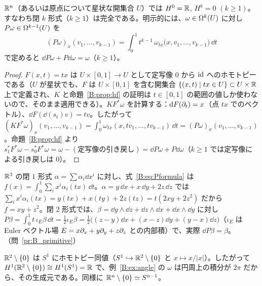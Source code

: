 \begin{cor}\label{B:cor:poincare}\tP
$\mathbb R^n$（あるいは原点について星状な開集合 $U$）では $H^0=\mathbb R$, $H^k=0$ $(k\ge1)$。すなわち閉 $k$ 形式（$k\ge1$）は完全である。明示的には、$\omega\in\Omega^k(U)$ に対し $P\omega\in\Omega^{k-1}(U)$ を
\begin{equation}\label{B:eq:Pformula}
(P\omega)_x(v_1,\dots,v_{k-1})=\int_0^1t^{k-1}\,\omega_{tx}\bigl(x,v_1,\dots,v_{k-1}\bigr)\,\dd t
\end{equation}
で定めると $\dd P\omega+P\dd\omega=\omega$（$k\ge1$）。
\end{cor}
\begin{proof}
$F(x,t)=tx$ は $U\times[0,1]\to U$ として定写像 $0$ から $\mathrm{id}$ へのホモトピーである（$U$ が星状でも、$F$ は $U\times[0,1]$ を含む開集合 $\{(x,t)\mid tx\in U\}\subset U\times\mathbb R$ 上で定義され、$K$ と命題~\ref{B:prop:hf} の証明は $t\in[0,1]$ の範囲の値しか使わないので、そのまま適用できる）。$KF^*\omega$ を計算する：$\mathrm{d} F(\partial_t)=x$（点 $tx$ でのベクトル）、$\dd F(\dd(s_t)v)=tv$。したがって $(KF^*\omega)_x(v_1,\dots,v_{k-1})=\int_0^1\omega_{tx}(x,tv_1,\dots,tv_{k-1})\,\dd t=(P\omega)_x(v_1,\dots,v_{k-1})$。命題~\ref{B:prop:hf} より $s_1^*F^*\omega-s_0^*F^*\omega=\omega-(\text{定写像の引き戻し})=\dd P\omega+P\dd\omega$（$k\ge1$ では定写像による引き戻しは $0$）。
\end{proof}

\begin{ex}[原始関数と原始形式]\label{B:ex:primitive}
$\mathbb R^3$ の閉 $1$ 形式 $\alpha=\sum\alpha_i\dd x^i$ に対し、式~\eqref{B:eq:Pformula} は $f(x)=\int_0^1\sum_ix^i\alpha_i(tx)\,\dd t$。$\alpha=y\,\dd x+x\,\dd y+2z\,\dd z$ では $\sum_ix^i\alpha_i(tx)=y(tx)+x(ty)+2z(tz)=t(2xy+2z^2)$ だから $f=xy+z^2$。閉 $2$ 形式では、$\beta=\dd y\wedge\dd z+\dd z\wedge\dd x+\dd x\wedge\dd y$ に対し $P\beta=\int_0^1t\,\iota_E\beta\,\dd t=\frac12\iota_E\beta=\frac12\bigl((z-y)\dd x+(x-z)\dd y+(y-x)\dd z\bigr)$（$\iota_E$ は Euler ベクトル場 $E=x\partial_x+y\partial_y+z\partial_z$ との内部積）で、実際 $\dd P\beta=\beta$。（問~\ref{pr:B_primitive}）
\end{ex}

\begin{ex}[$\R^2\setminus\{0\}$]\label{B:ex:punct}
$\R^2\setminus\{0\}$ は $S^1$ にホモトピー同値（$S^1\hookrightarrow\mathbb R^2\setminus\{0\}$ と $x\mapsto x/|x|$）。したがって $H^1(\mathbb R^2\setminus\{0\})\cong H^1(S^1)=\mathbb R$ で、例~\ref{B:ex:angle} の $\omega$ は円周上の積分が $2\pi$ だから、その生成元である。同様に $\mathbb R^n\setminus\{0\}\simeq S^{n-1}$。
\end{ex}

